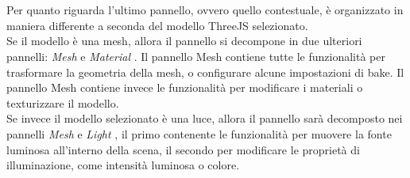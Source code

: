 \\
\\
Per quanto riguarda l’ultimo pannello, ovvero quello contestuale, è organizzato in maniera differente a seconda del modello ThreeJS selezionato.
\\ 
Se il modello è una mesh, allora il pannello si decompone in due ulteriori pannelli: \emph{Mesh} e \emph{Material} . Il pannello Mesh contiene tutte le funzionalità per trasformare la geometria della mesh, o configurare alcune impostazioni di bake. Il pannello Mesh contiene invece le funzionalità per modificare i materiali o texturizzare il modello.
\\
Se invece il modello selezionato è una luce, allora il pannello sarà decomposto nei pannelli \emph{Mesh} e \emph{Light} , il primo contenente le funzionalità per muovere la fonte luminosa all’interno della scena, il secondo per modificare le proprietà di illuminazione, come intensità luminosa o colore. 